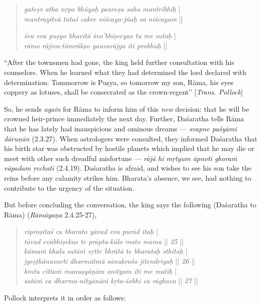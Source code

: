\begin{quote}
{{\sl gateṣv atha nṛpo bhūyaḥ paureṣu saha mantribhiḥ}} |\\
{{\sl mantrayitvā tataś cakre niścaya-jñaḥ sa niścayam}} ||

{\sl śva eva puṣyo bhavitā śvo’bhiṣecyas tu me sutaḥ} |\\
{\sl rāmo rājīva-tāmrākṣo yauvarājya iti prabhuḥ} ||
\end{quote}

\begin{myquote}
“After the townsmen had gone, the king held further consultation with his counselors. When he learned what they had determined the lord declared with determination: Tommorrow is Puṣya, so tomorrow my son, Rāma, his eyes coppery as lotuses, shall be consecrated as the crown-regent” [{\sl Trans. Pollock}]
\end{myquote}

So, he sends {\sl again} for Rāma to inform him of this {\sl new} decision: that he will be crowned heir-prince immediately the next day. Further, Daśaratha tells Rāma that he has lately had inauspicious and ominous dreams --- {\sl svapne paśyāmi dāruṇān} (2.3.27). When astrologers were consulted, they informed Daśaratha that his birth star was obstructed by hostile planets which implied that he may die or meet with other such dreadful misfortune --- {\sl rājā hi mṛtyum āpnoti ghoraṁ vāpadam ṛcchati} (2.4.19). Daśaratha is afraid, and wishes to see his son take the reins before any calamity strikes him. Bharata’s absence, we see, had nothing to contribute to the urgency of the situation. 

But before concluding the conversation, the king says the following (Daśaratha to Rāma) ({\sl Rāmāyaṇa} 2.4.25-27), 
\begin{quote}
{{\sl viproṣitaś ca bharato yāvad eva purād itaḥ}} |\\
{{\sl tāvad evābhiṣekas te prāpta-kālo mato mama}} || {\sl 25} ||\\
{\sl kāmaṁ khalu satāṁ vṛtte bhrātā te bharataḥ sthitaḥ} |\\
{\sl jyeṣṭhānuvartī dharmātmā sānukrośo jitendriyaḥ} || {\sl 26} ||\\
{\sl kintu cittaṁ manuṣyāṇām anityam iti me matiḥ} |\\
{\sl satāṁ ca dharma-nityānāṁ kṛta-śobhi ca rāghava} || {\sl 27} ||
\end{quote}

Pollock interprets it in order as follows:

